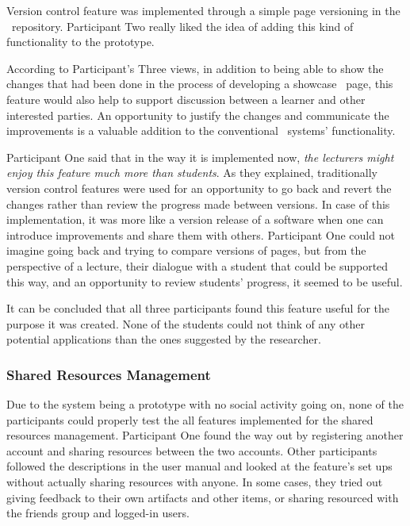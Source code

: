 Version control feature was implemented through a simple page versioning in the
\ep~repository. Participant Two really liked the idea of adding this kind of
functionality to the prototype.


According to Participant's Three views, in addition to being able to show the
changes that had been done in the process of developing a showcase \ep~page,
this feature would also help to support discussion between a learner and other
interested parties. An opportunity to justify the changes and communicate the
improvements is a valuable addition to the conventional \ep~systems'
functionality.


Participant One said that in the way it is implemented now, \textit{the
lecturers might enjoy this feature much more than students}. As they explained,
traditionally version control features were used for an opportunity to go
back and revert the changes rather than review the progress made between
versions. In case of this implementation, it was more like a version release of
a software when one can introduce improvements and share them with others.
Participant One could not imagine going back and trying to compare versions of
pages, but from the perspective of a lecture, their dialogue with a student
that could be supported this way, and an opportunity to review students'
progress, it seemed to be useful.

It can be concluded that all three participants found this feature useful for
the purpose it was created. None of the students could not think of any other
potential applications than the ones suggested by the researcher.

\subsubsection{Shared Resources Management}

Due to the system being a prototype with no social activity going on, none of
the participants could properly test the all features implemented for the shared
resources management. Participant One found the way out by registering another
account and sharing resources between the two accounts. Other participants
followed the descriptions in the user manual and looked at the feature's set ups
without actually sharing resources with anyone. In some cases, they tried out
giving feedback to their own artifacts and other items, or sharing resourced
with the friends group and logged-in users.

